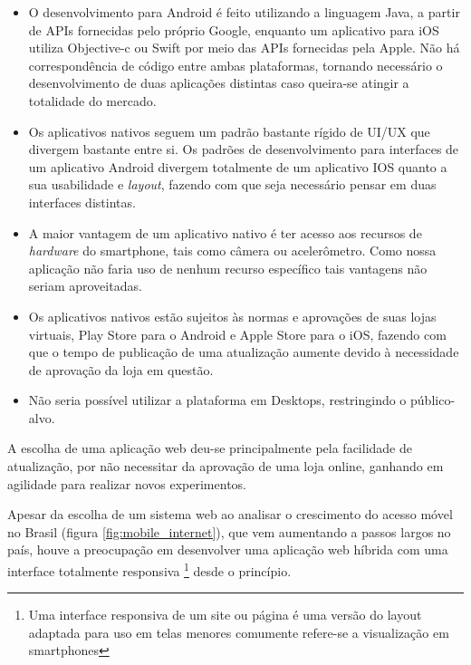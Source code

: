 \begin{itemize}
\item O desenvolvimento para Android é feito utilizando a linguagem Java, a partir de APIs fornecidas pelo próprio Google, enquanto um aplicativo para iOS utiliza Objective-c ou Swift por meio das APIs fornecidas pela Apple. Não há correspondência de código entre ambas plataformas, tornando necessário o desenvolvimento de duas aplicações distintas caso queira-se atingir a totalidade do mercado.
\item Os aplicativos nativos seguem um padrão bastante rígido de UI/UX que divergem bastante entre si. Os padrões de desenvolvimento para interfaces de um aplicativo Android divergem totalmente de um aplicativo IOS quanto a sua usabilidade e \emph{layout}, fazendo com que seja necessário pensar em duas interfaces distintas.
\item A maior vantagem de um aplicativo nativo é ter acesso aos recursos de \emph{hardware} do smartphone, tais como câmera ou acelerômetro. Como nossa aplicação não faria uso de nenhum recurso específico tais vantagens não seriam aproveitadas.
\item Os aplicativos nativos estão sujeitos às normas e aprovações de suas lojas virtuais, Play Store para o Android e Apple Store para o iOS, fazendo com que o tempo de publicação de uma atualização aumente devido à necessidade de aprovação da loja em questão.
\item Não seria possível utilizar a plataforma em Desktops, restringindo o público-alvo.
\end{itemize}
\par A escolha de uma aplicação web deu-se principalmente pela facilidade de atualização, por não necessitar da aprovação de uma loja online, ganhando em agilidade para realizar novos experimentos.
\par Apesar da escolha de um sistema web ao analisar o crescimento do acesso móvel no Brasil (figura \ref{fig:mobile_internet}), que vem aumentando a passos largos no país, houve a preocupação em desenvolver uma aplicação web híbrida com uma interface totalmente responsiva \footnote{ Uma interface responsiva de um site ou página é uma versão do layout adaptada para uso em telas menores comumente refere-se a visualização em smartphones} desde o princípio.
